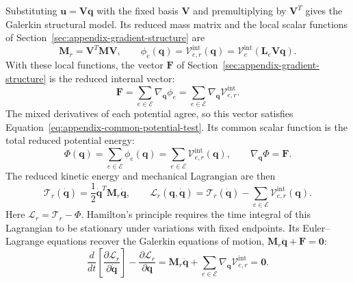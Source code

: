 \documentclass[a4paper,12pt]{article}
\newcommand{\vect}[1]{\boldsymbol{#1}}
\newcommand{\matr}[1]{\boldsymbol{#1}}
\begin{document}
Substituting $\vect{u}=\matr{V}\vect{q}$ with the fixed basis $\matr{V}$ and premultiplying by $\matr{V}^T$ gives the Galerkin structural model. Its reduced mass matrix and the local scalar functions of Section~\ref{sec:appendix-gradient-structure} are
\[
 \matr{M}_r=\matr{V}^T\matr{M}\matr{V},
 \qquad
 \phi_e(\vect{q})
 =\mathcal V_{e,r}^{\mathrm{int}}(\vect{q})
 =\mathcal V_e^{\mathrm{int}}(\matr{L}_e\matr{V}\vect{q}).
\]
With these local functions, the vector $\vect{F}$ of Section~\ref{sec:appendix-gradient-structure} is the reduced internal vector:
\[
 \vect{F}
 =\sum_{e\in\mathcal E}\nabla_{\vect{q}}\phi_e
 =\sum_{e\in\mathcal E}\nabla_{\vect{q}}\mathcal V_{e,r}^{\mathrm{int}}.
\]
The mixed derivatives of each potential agree, so this vector satisfies Equation~\eqref{eq:appendix-common-potential-test}. Its common scalar function is the total reduced potential energy:
\[
 \Phi(\vect{q})
 =\sum_{e\in\mathcal E}\phi_e(\vect{q})
 =\sum_{e\in\mathcal E}\mathcal V_{e,r}^{\mathrm{int}}(\vect{q}),
 \qquad
 \nabla_{\vect{q}}\Phi=\vect{F}.
\]
The reduced kinetic energy and mechanical Lagrangian are then
\begin{equation}
 \mathcal T_r(\dot{\vect{q}})
 =\frac12\dot{\vect{q}}^T\matr{M}_r\dot{\vect{q}},
 \qquad
 \mathcal L_r(\vect{q},\dot{\vect{q}})
 =\mathcal T_r(\dot{\vect{q}})
   -\sum_{e\in\mathcal E}\mathcal V_{e,r}^{\mathrm{int}}(\vect{q}).
 \label{eq:appendix-reduced-lagrangian}
\end{equation}
Here $\mathcal L_r=\mathcal T_r-\Phi$. Hamilton's principle requires the time integral of this Lagrangian to be stationary under variations with fixed endpoints. Its Euler--Lagrange equations recover the Galerkin equations of motion, $\matr{M}_r\ddot{\vect{q}}+\vect{F}=\vect{0}$:
\begin{equation}
 \frac{d}{dt}\left[\frac{\partial\mathcal L_r}{\partial\dot{\vect{q}}}\right]
 -\frac{\partial\mathcal L_r}{\partial\vect{q}}
 =\matr{M}_r\ddot{\vect{q}}
  +\sum_{e\in\mathcal E}\nabla_{\vect{q}}\mathcal V_{e,r}^{\mathrm{int}}
 =\vect{0}.
 \label{eq:appendix-galerkin-structural-motion}
\end{equation}
\end{document}

